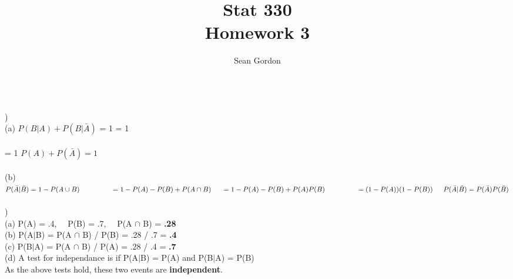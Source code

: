 \documentclass[12pt]{article}
\title{Stat 330\\Homework 3}
\author{Sean Gordon}
\begin{document}
\maketitle


\noindent\hrulefill \\


)\\
\indent (a) $P(B|A) + P(B|\bar{A})$ = 1
\indent \indent {} = 1\\\\
\indent {} = 1
\indent \indent \indent  $P(A) + P(\bar{A}) = 1$ \checkmark\\

\indent \indent  \hrulefill \indent \indent \indent \\

\indent (b) $P(\bar{A}|\bar{B}) = 1 - P(A \cup B)
\indent \indent \indent = 1 - P(A) - P(B) + P(A \cap B)\\\\
\indent = 1 - P(A) - P(B) + P(A)P(B)
\indent \indent \indent = (1 - P(A))(1 - P(B))\\\\
\indent  P(\bar{A}|\bar{B}) = P(\bar{A})P(\bar{B})$ \checkmark\\


\noindent \hrulefill \\


)\\
\indent (a) P(A) = .4, \ \ P(B) = .7, \ \ P(A $\cap$ B) = \textbf{.28}\\
\indent (b) P(A$|$B) = P(A $\cap$ B) / P(B) = .28 / .7 = \textbf{.4}\\
\indent (c) P(B$|$A) = P(A $\cap$ B) / P(A) = .28 / .4 = \textbf{.7}\\
\indent (d) A test for independance is if P(A$|$B) = P(A) and P(B$|$A) = P(B)\\
\indent \indent As the above tests hold, these two events are \textbf{independent}.\\


\noindent \hrulefill \\
\pagebreak
\end{document}
